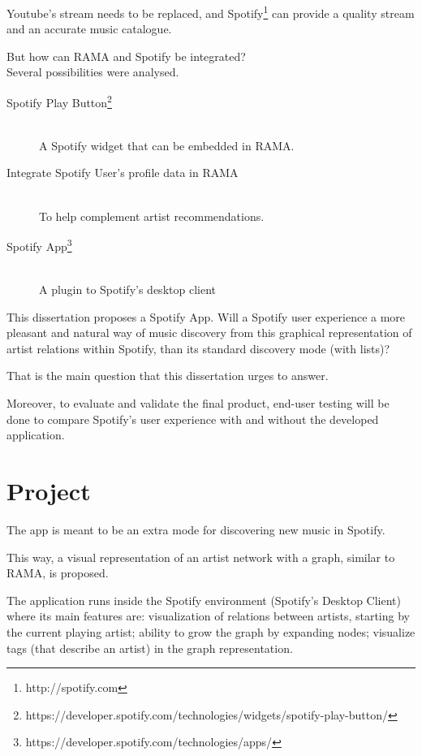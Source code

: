 Youtube's stream needs to be replaced, and Spotify\footnote{http://spotify.com} can provide a quality stream and an accurate music catalogue.

But how can RAMA and Spotify be integrated? \\

Several possibilities were analysed.

\begin{description}
  \item[Spotify Play Button\footnote{https://developer.spotify.com/technologies/widgets/spotify-play-button/}] \hfill \\
    A Spotify widget that can be embedded in RAMA. 
  \item[Integrate Spotify User's profile data in RAMA] \hfill \\
    To help complement artist recommendations.
  \item[Spotify App\footnote{https://developer.spotify.com/technologies/apps/}] \hfill \\
    A plugin to Spotify's desktop client
\end{description}


This dissertation proposes a Spotify App.
Will a Spotify user experience a more pleasant and natural way of music discovery from this graphical representation of artist relations within Spotify, than its standard discovery mode (with lists)?

That is the main question that this dissertation urges to answer.

Moreover, to evaluate and validate the final product, end-user testing will be done to compare Spotify's user experience with and without the developed application. 


\section{Project} \label{sec:proj}

The app is meant to be an extra mode for discovering new music in Spotify.

This way, a visual representation of an artist network with a graph, similar to RAMA, is proposed.

The application runs inside the Spotify environment (Spotify's Desktop Client) where its main features are: visualization of relations between artists, starting by the current playing artist; ability to grow the graph by expanding nodes; visualize tags (that describe an artist) in the graph representation.

